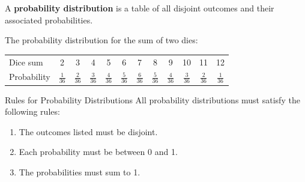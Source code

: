 \documentclass{beamer}
\begin{document}
\begin{frame}
\begin{definition}
A \textbf{probability distribution} is a table of all disjoint outcomes and their associated probabilities.
\end{definition}\pause

\begin{example}\label{dice sum prob. dist.}
\vspace{-2mm}%
The probability distribution for the sum of two dies:
\begin{center}
\begin{tabular}{lccccccccccc}\hline
Dice sum & 2 & 3 & 4 & 5 & 6 & 7 & 8 & 9 & 10 & 11 & 12 \\
Probability & $\tfrac{1}{36}$ & $\tfrac{2}{36}$ & $\tfrac{3}{36}$ & $\tfrac{4}{36}$ & $\tfrac{5}{36}$ & $\tfrac{6}{36}$ & $\tfrac{5}{36}$ & $\tfrac{4}{36}$ & $\tfrac{3}{36}$ & $\tfrac{2}{36}$ & $\tfrac{1}{36}$ \\[0.75mm]\hline
\end{tabular}
\end{center}
\end{example}\pause

\begin{block}{Rules for Probability Distributions}
All probability distributions must satisfy the following rules:
\begin{enumerate}
\item The outcomes listed must be disjoint.
\item Each probability must be between 0 and 1.
\item The probabilities must sum to 1.
\end{enumerate}
\end{block}
\end{frame}
\end{document}
